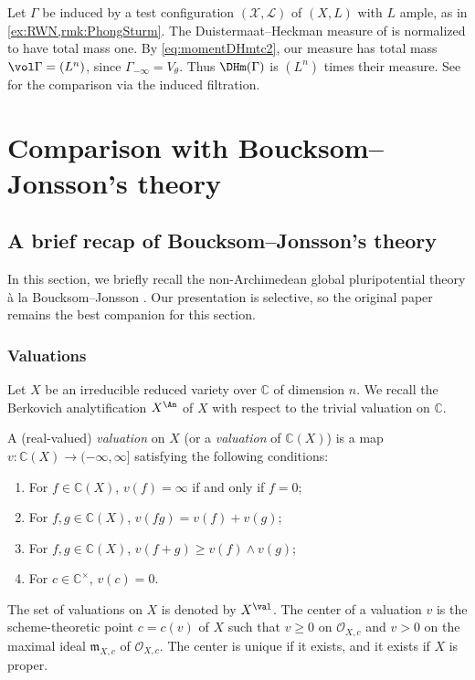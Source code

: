 \begin{remark}\label{rmk:NApotential:L862}
    Let $\Gamma$ be induced by a test configuration $(\mathcal X,\mathcal L)$ of $(X,L)$ with $L$ ample, as in \cref{ex:RWN,rmk:PhongSturm}. The Duistermaat--Heckman measure of \cite[Section~3.2]{BHJ17} is normalized to have total mass one. By \eqref{eq:momentDHmtc2}, our measure has total mass $\vol\Gamma=(L^n)$, since $\Gamma_{-\infty}=V_\theta$. Thus $\DHm(\Gamma)$ is $(L^n)$ times their measure. See \cite[Remark~7.17]{Xia21} for the comparison via the induced filtration.
\end{remark}

\section{Comparison with Boucksom--Jonsson's theory}\label{sec:compBJ}

\subsection{A brief recap of Boucksom--Jonsson's theory}
\label{subsec:BJ_recap}

In this section, we briefly recall the non-Archimedean global pluripotential theory à la Boucksom--Jonsson \cite{BJ22}. Our presentation is selective, so the original paper remains the best companion for this section.

\subsubsection{Valuations}
\label{subsubsec:BJ_val}

Let $X$ be an irreducible reduced variety over $\mathbb{C}$ of dimension $n$. We recall the Berkovich analytification $X^{\An}$ of $X$ with respect to the trivial valuation on $\mathbb{C}$.

\begin{definition}\label{def:NApotential:L878}
    A (real-valued) \emph{valuation} on $X$ (or a \emph{valuation} of $\mathbb{C}(X)$) is a map $v\colon \mathbb{C}(X)\rightarrow (-\infty,\infty]$ satisfying the following conditions:
\begin{enumerate}
    \item\label{itm:chapter-NApotential:L883:1} For $f\in \mathbb{C}(X)$, $v(f)=\infty$ if and only if $f=0$;
    \item\label{itm:chapter-NApotential:L883:2} For $f,g\in \mathbb{C}(X)$, $v(fg)=v(f)+v(g)$;
    \item\label{itm:chapter-NApotential:L883:3} For $f,g\in \mathbb{C}(X)$, $v(f+g)\geq v(f)\land v(g)$;
    \item\label{itm:chapter-NApotential:L883:4} For $c\in \mathbb{C}^{\times}$, $v(c)=0$.
\end{enumerate}
\end{definition}
The set of valuations on $X$ is denoted by $X^{\val}$. The center of a valuation $v$ is the scheme-theoretic point $c=c(v)$ of $X$ such that $v\geq 0$ on $\mathcal{O}_{X,c}$ and $v>0$ on the maximal ideal $\mathfrak{m}_{X,c}$ of $\mathcal{O}_{X,c}$. The center is unique if it exists, and it exists if $X$ is proper.

